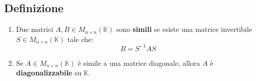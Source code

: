 \documentclass[a4paper]{article}
\theoremstyle{break}
\theoremstyle{break}
\theoremstyle{break}
\theoremstyle{break}
\begin{document}
\subsection{Definizione}
\begin{enumerate}
  \item Due matrici \( A,B \in M_{n \times n}(\mathbb{K}) \) sono \textbf{simili} se
    esiste una matrice invertibile \( S \in M_{n \times n}(\mathbb{K}) \) tale che:
    \[
    B = S^{-1}AS
    \] 

  \item Se \( A \in  M_{n \times n}(\mathbb{K}) \) è simile a una matrice diagonale,
    allora \( A \) è \textbf{diagonalizzabile} su \( \mathbb{K} \).
\end{enumerate}
\end{document}
